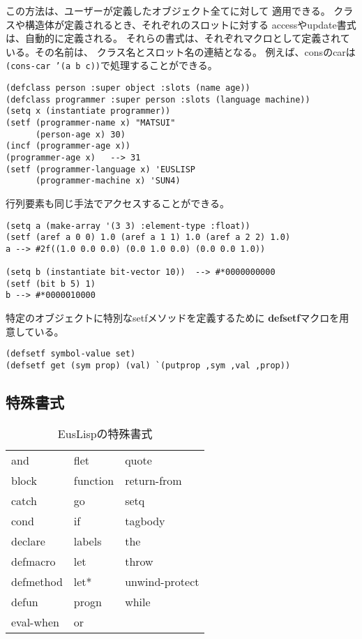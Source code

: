 この方法は、ユーザーが定義したオブジェクト全てに対して
適用できる。
クラスや構造体が定義されるとき、それぞれのスロットに対する
accessやupdate書式は、自動的に定義される。
それらの書式は、それぞれマクロとして定義されている。その名前は、
クラス名とスロット名の連結となる。
例えば、consのcarは{\tt (cons-car '(a b c))}で処理することができる。

\begin{verbatim}
(defclass person :super object :slots (name age))
(defclass programmer :super person :slots (language machine))
(setq x (instantiate programmer))
(setf (programmer-name x) "MATSUI"
      (person-age x) 30)
(incf (programmer-age x))
(programmer-age x)   --> 31
(setf (programmer-language x) 'EUSLISP
      (programmer-machine x) 'SUN4)
\end{verbatim}

行列要素も同じ手法でアクセスすることができる。

\begin{verbatim}
(setq a (make-array '(3 3) :element-type :float))
(setf (aref a 0 0) 1.0 (aref a 1 1) 1.0 (aref a 2 2) 1.0)
a --> #2f((1.0 0.0 0.0) (0.0 1.0 0.0) (0.0 0.0 1.0))

(setq b (instantiate bit-vector 10))  --> #*0000000000
(setf (bit b 5) 1)
b --> #*0000010000
\end{verbatim}

特定のオブジェクトに特別なsetfメソッドを定義するために
{\bf defsetf}マクロを用意している。

\begin{verbatim}
(defsetf symbol-value set)
(defsetf get (sym prop) (val) `(putprop ,sym ,val ,prop))
\end{verbatim}

\subsection{特殊書式}

\begin{table}
\caption{\label{SpecialForms}EusLispの特殊書式}
\begin{center}
{\large
\begin{tabular}{|l l l|} \hline 
and & flet & quote \\
block & function & return-from\\
catch & go & setq \\
cond & if & tagbody \\
declare & labels & the \\
defmacro & let & throw \\
defmethod & let* & unwind-protect \\
defun & progn & while \\
eval-when & or & \\
\hline
\end{tabular} }
\end{center}
\end{table}


